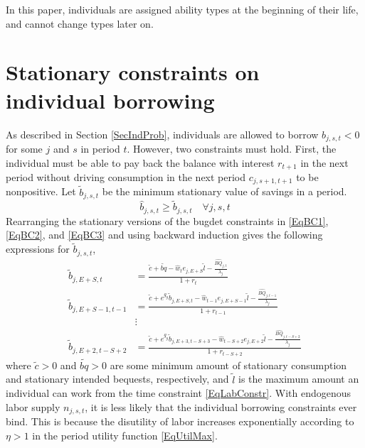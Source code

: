 \documentclass[letterpaper,12pt]{article}
\theoremstyle{definition}
\begin{document}
  In this paper, individuals are assigned ability types at the beginning of their life, and cannot change types later on.


\newpage
\section{Stationary constraints on individual borrowing}\label{AppBorConstr}

  \setcounter{equation}{0}

  As described in Section \ref{SecIndProb}, individuals are allowed to borrow $b_{j,s,t}<0$ for some $j$ and $s$ in period $t$. However, two constraints must hold. First, the individual must be able to pay back the balance with interest $r_{t+1}$ in the next period without driving consumption in the next period $c_{j,s+1,t+1}$ to be nonpositive. Let $\tilde{b}_{j,s,t}$ be the minimum stationary value of savings in a period.
  \begin{equation}\label{EqSavMin}
    \hat{b}_{j,s,t}\geq\tilde{b}_{j,s,t} \quad\forall j,s,t
  \end{equation}
  Rearranging the stationary versions of the bugdet constraints in \eqref{EqBC1}, \eqref{EqBC2}, and \eqref{EqBC3} and using backward induction gives the following expressions for $\tilde{b}_{j,s,t}$,
  \begin{equation}\label{EqBorConsts}
    \begin{split}
      \tilde{b}_{j,E+S,t} &= \frac{\tilde{c} + \tilde{bq} - \hat{w}_t e_{j,E+S}\tilde{l} - \frac{\hat{BQ}_{j,t}}{\lambda_j}}{1+r_t}  \\
      \tilde{b}_{j,E+S-1,t-1} &= \frac{\tilde{c} + e^{g_y}\tilde{b}_{j,E+S,t} - \hat{w}_{t-1}e_{j,E+S-1}\tilde{l} - \frac{\hat{BQ}_{j,t-1}}{\lambda_j}}{1+r_{t-1}} \\
      &\vdots \\
      \tilde{b}_{j,E+2,t-S+2} &= \frac{\tilde{c} + e^{g_y}\tilde{b}_{j,E+3,t-S+3} - \hat{w}_{t-S+2}e_{j,E+2}\tilde{l} - \frac{\hat{BQ}_{j,t-S+2}}{\lambda_j}}{1+r_{t-S+2}}
    \end{split}
  \end{equation}
  where $\tilde{c}>0$ and $\tilde{bq}>0$ are some minimum amount of stationary consumption and stationary intended bequests, respectively, and $\tilde{l}$ is the maximum amount an individual can work from the time constraint \eqref{EqLabConstr}. With endogenous labor supply $n_{j,s,t}$, it is less likely that the individual borrowing constraints ever bind. This is because the disutility of labor increases exponentially according to $\eta>1$ in the period utility function \eqref{EqUtilMax}.
\end{document}
